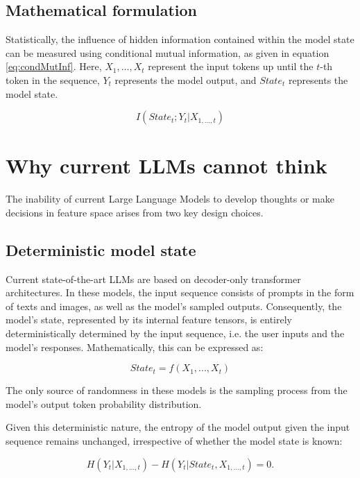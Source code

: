 \documentclass{article}
\begin{document}
\subsection{Mathematical formulation}
Statistically, the influence of hidden information contained within the model state can be measured using conditional mutual information, as given in equation \ref{eq:condMutInf}. Here, $X_1,\dots,X_t$ represent the input tokens up until the $t$-th token in the sequence, $Y_t$ represents the model output, and $State_t$ represents the model state. 

\begin{equation}
\label{eq:condMutInf}
I(State_t; Y_t | X_{1,\dots,t})
\end{equation}

\section{Why current LLMs cannot think}
\label{sec:proof}

The inability of current Large Language Models to develop thoughts or make decisions in feature space arises from two key design choices.

\subsection{Deterministic model state}
Current state-of-the-art LLMs are based on decoder-only transformer architectures. In these models, the input sequence consists of prompts in the form of texts and images, as well as the model's sampled outputs. Consequently, the model's state, represented by its internal feature tensors, is entirely deterministically determined by the input sequence, i.e. the user inputs and the model's responses. 
Mathematically, this can be expressed as:

\begin{equation}
State_t = f(X_1, ..., X_t)
\end{equation}

The only source of randomness in these models is the sampling process from the model's output token probability distribution. 

Given this deterministic nature, the entropy of the model output given the input sequence remains unchanged, irrespective of whether  the model state is known:

\begin{equation}
H(Y_t | X_{1,\dots,t}) - H(Y_t | State_t, X_{1,\dots,t}) = 0.
\end{equation}
\end{document}
